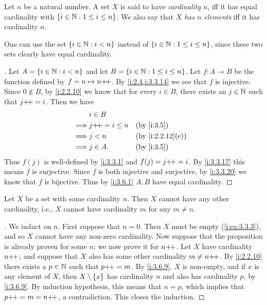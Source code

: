 \begin{defn}\label{i:3.6.5}
  Let \(n\) be a natural number.
  A set \(X\) is said to have \emph{cardinality} \(n\), iff it has equal cardinality with \(\left\lbrace i \in \mathbb{N} : 1 \leq i \leq n\right\rbrace\).
  We also say that \(X\) \emph{has \(n\) elements} iff it has cardinality \(n\).
\end{defn}

\begin{rmk}\label{i:3.6.6}
  One can use the set \(\left\lbrace i \in \mathbb{N} : i < n\right\rbrace\) instead of \(\left\lbrace i \in \mathbb{N} : 1 \leq i \leq n\right\rbrace\), since these two sets clearly have equal cardinality.
\end{rmk}

\begin{proof}[]
  Let \(A = \left\lbrace i \in \mathbb{N} : i < n\right\rbrace\) and let \(B = \left\lbrace i \in \mathbb{N} : 1 \leq i \leq n\right\rbrace\).
  Let \(f : A \to B\) be the function defined by \(f = n \mapsto n{+}\!{+}\).
  By \cref{i:2.4,i:3.3.14} we see that \(f\) is injective.
  Since \(0 \notin B\), by \cref{i:2.2.10} we know that for every \(i \in B\), there exists an \(j \in \mathbb{N}\) such that \(j{+}\!{+} = i\).
  Then we have
  \begin{align*}
             & i \in B                               \\
    \implies & j\pp = i \leq n &  & \by{i:3.5}       \\
    \implies & j < n           &  & \by{i:2.2.12}[e] \\
    \implies & j \in A.        &  & \by{i:3.5}
  \end{align*}
  Thus \(f(j)\) is well-defined by \cref{i:3.3.1} and \(f(j) = j{+}\!{+} = i\).
  By \cref{i:3.3.17} this means \(f\) is surjective.
  Since \(f\) is both injective and surjective, by \cref{i:3.3.20} we know that \(f\) is bijective.
  Thus by \cref{i:3.6.1} \(A, B\) have equal cardinality.
\end{proof}

\setcounter{thm}{7}
\begin{prop}\label{i:3.6.8}
  Let \(X\) be a set with some cardinality \(n\).
  Then \(X\) cannot have any other cardinality, i.e., \(X\) cannot have cardinality \(m\) for any \(m \neq n\).
\end{prop}

\begin{proof}[]
  We induct on \(n\).
  First suppose that \(n = 0\).
  Then \(X\) must be empty (\cref{i:ex:3.3.3}), and so \(X\) cannot have any non-zero cardinality.
  Now suppose that the proposition is already proven for some \(n\);
  we now prove it for \(n{+}\!{+}\).
  Let \(X\) have cardinality \(n{+}\!{+}\);
  and suppose that \(X\) also has some other cardinality \(m \neq n{+}\!{+}\).
  By \cref{i:2.2.10} there exists a \(p \in \mathbb{N}\) such that \(p{+}\!{+} = m\).
  By \cref{i:3.6.9}, \(X\) is non-empty, and if \(x\) is any element of \(X\), then \(X \setminus \left\lbrace x\right\rbrace\) has cardinality \(n\) and also has cardinality \(p\), by \cref{i:3.6.9}.
  By induction hypothesis, this means that \(n = p\), which implies that \(p{+}\!{+} = m = n{+}\!{+}\), a contradiction.
  This closes the induction.
\end{proof}

